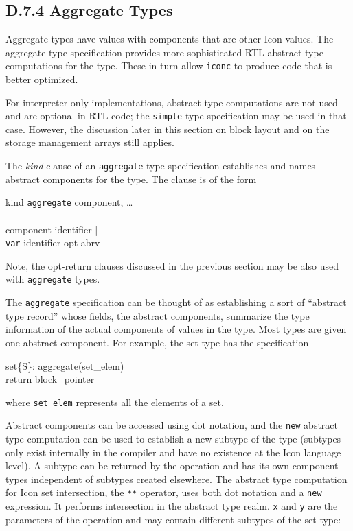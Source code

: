 \subsection{D.7.4 Aggregate Types}

Aggregate types have values with components that are other Icon values.
The aggregate type specification provides more sophisticated RTL abstract
type computations for the type. These in turn allow \texttt{iconc} to
produce code that is better optimized.

For interpreter-only implementations, abstract type computations are not
used and are optional in RTL code; the \texttt{simple} type specification
may be used in that case. However, the discussion later in this section on
block layout and on the storage management arrays still applies.


The \textit{kind} clause of an \texttt{aggregate} type specification
establishes and names abstract components for the type. The clause is of
the form

\begin{ebnf}
kind \cceq \texttt{aggregate} \toklbra component, \ldots \tokrbra\\
\\
component \cceq identifier |\\
\>\>\>\>\>       \texttt{var} identifier opt-abrv
\end{ebnf}

\noindent
Note, the opt-return clauses discussed in the previous section may be
also used with \texttt{aggregate} types.

The \texttt{aggregate} specification can be thought of as establishing a
sort of ``abstract type record'' whose fields, the abstract components,
summarize the type information of the actual components of values in the
type. Most types are given one abstract component. For example, the set
type has the specification
\begin{iconcode}
set\{S\}: \>\>\> aggregate(set\_elem)\\
\>\>\>           return block\_pointer
\end{iconcode}
\noindent
where \texttt{set\_elem} represents all the elements of a set.


Abstract components can be accessed using dot notation, and the
\texttt{new} abstract type computation can be used to establish a
new subtype of the type (subtypes only exist internally in the
compiler and have no existence at the Icon language level). A subtype
can be returned by the operation and has its own component types
independent of subtypes created elsewhere. The abstract type
computation for Icon set intersection, the \texttt{**} operator, uses
both dot notation and a \texttt{new} expression. It performs
intersection in the abstract type realm. \texttt{x} and \texttt{y} are
the parameters of the operation and may contain different subtypes of
the set type:

